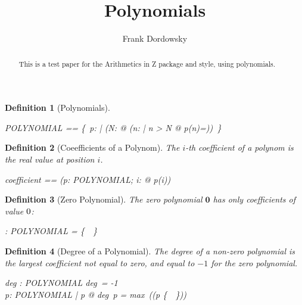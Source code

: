 \documentclass[12pt]{scrartcl}
\newtheorem{zdef}{Definition}[section]
\begin{document}
\title{Polynomials}
\author{Frank Dordowsky}

\maketitle

\begin{abstract}
  This is a test paper for the Arithmetics in Z package and style,
  using polynomials.
\end{abstract}





\begin{zdef}[Polynomials]
  \label{zdef:polynomials}
  \begin{zed}
    POLYNOMIAL == \{~p: \nat \fun \real | (\exists N: \nat @ (\forall n:
    \nat | n > N @ p(n)=\azero))~\}
  \end{zed}
\end{zdef}

\begin{zdef}[Coeefficients of a Polynom]
  \label{zdef:coefficient}
  The $i$-th coefficient of a polynom is the real value at position
  $i$. 
  \begin{zed}
    coefficient == (\lambda p: POLYNOMIAL; i: \nat @ p(i))
  \end{zed}
\end{zdef}

\newcommand{\zeropol}{\mathbf{0}}
\begin{zdef}[Zero Polynomial]
  \label{zdef:zero-polynomial}
  The \emph{zero polynomial} $\zeropol$ has only coefficients of value
  $0$:
  \begin{axdef}
    \zeropol : POLYNOMIAL
    \where
    \ran \zeropol = \{~\azero~\}
  \end{axdef}
\end{zdef}

\begin{zdef}[Degree of a Polynomial]
  The degree of a non-zero polynomial is the largest coefficient not equal to
  zero, and equal to $-1$ for the zero polynomial.
  \label{zdef:degree}
  \begin{axdef}
    deg : POLYNOMIAL \fun \nat
    \where
    deg~\zeropol = -1 \\
    \forall p: POLYNOMIAL | p \neq \zeropol @ deg~p = max~(\dom (p \nrres
  \{~\azero~\}))\\
  \end{axdef}
\end{zdef}
\end{document}
